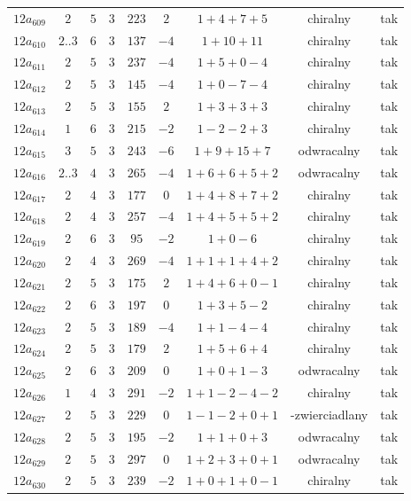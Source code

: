 \begin{longtable}{ccccccccc}
$12a_{609}$ & $2$ & $5$ & $3$ & $223$ & $2$ & $1+4+7+5$ & chiralny & tak \\
$12a_{610}$ & $2..3$ & $6$ & $3$ & $137$ & $-4$ & $1+10+11$ & chiralny & tak \\
$12a_{611}$ & $2$ & $5$ & $3$ & $237$ & $-4$ & $1+5+0-4$ & chiralny & tak \\
$12a_{612}$ & $2$ & $5$ & $3$ & $145$ & $-4$ & $1+0-7-4$ & chiralny & tak \\
$12a_{613}$ & $2$ & $5$ & $3$ & $155$ & $2$ & $1+3+3+3$ & chiralny & tak \\
$12a_{614}$ & $1$ & $6$ & $3$ & $215$ & $-2$ & $1-2-2+3$ & chiralny & tak \\
$12a_{615}$ & $3$ & $5$ & $3$ & $243$ & $-6$ & $1+9+15+7$ & odwracalny & tak \\
$12a_{616}$ & $2..3$ & $4$ & $3$ & $265$ & $-4$ & $1+6+6+5+2$ & odwracalny & tak \\
$12a_{617}$ & $2$ & $4$ & $3$ & $177$ & $0$ & $1+4+8+7+2$ & chiralny & tak \\
$12a_{618}$ & $2$ & $4$ & $3$ & $257$ & $-4$ & $1+4+5+5+2$ & chiralny & tak \\
$12a_{619}$ & $2$ & $6$ & $3$ & $95$ & $-2$ & $1+0-6$ & chiralny & tak \\
$12a_{620}$ & $2$ & $4$ & $3$ & $269$ & $-4$ & $1+1+1+4+2$ & chiralny & tak \\
$12a_{621}$ & $2$ & $5$ & $3$ & $175$ & $2$ & $1+4+6+0-1$ & chiralny & tak \\
$12a_{622}$ & $2$ & $6$ & $3$ & $197$ & $0$ & $1+3+5-2$ & chiralny & tak \\
$12a_{623}$ & $2$ & $5$ & $3$ & $189$ & $-4$ & $1+1-4-4$ & chiralny & tak \\
$12a_{624}$ & $2$ & $5$ & $3$ & $179$ & $2$ & $1+5+6+4$ & chiralny & tak \\
$12a_{625}$ & $2$ & $6$ & $3$ & $209$ & $0$ & $1+0+1-3$ & odwracalny & tak \\
$12a_{626}$ & $1$ & $4$ & $3$ & $291$ & $-2$ & $1+1-2-4-2$ & chiralny & tak \\
$12a_{627}$ & $2$ & $5$ & $3$ & $229$ & $0$ & $1-1-2+0+1$ & -zwierciadlany & tak \\
$12a_{628}$ & $2$ & $5$ & $3$ & $195$ & $-2$ & $1+1+0+3$ & odwracalny & tak \\
$12a_{629}$ & $2$ & $5$ & $3$ & $297$ & $0$ & $1+2+3+0+1$ & odwracalny & tak \\
$12a_{630}$ & $2$ & $5$ & $3$ & $239$ & $-2$ & $1+0+1+0-1$ & chiralny & tak \\

\end{longtable}
